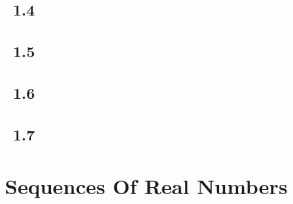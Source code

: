 \documentclass[11pt, letterpaper]{article}
\begin{document}
\subsection{\exr \, 1.4}
\clearpage

\subsection{\exr \, 1.5}
\clearpage

\subsection{\exr \, 1.6}
\clearpage

\subsection{\exr \, 1.7}
\clearpage

\section{Sequences Of Real Numbers}
\end{document}
